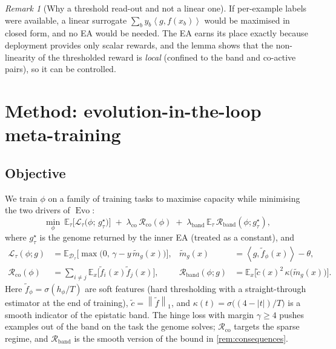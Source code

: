 \documentclass[11pt,a4paper]{article}
\theoremstyle{definition}
\theoremstyle{plain}
\theoremstyle{remark}
\newtheorem{remark}[definition]{Remark}
\newcommand{\E}{\mathbb{E}}
\newcommand{\Dist}{\mathcal{D}}
\newcommand{\norm}[1]{\left\lVert #1 \right\rVert}
\newcommand{\ip}[2]{\left\langle #1, #2 \right\rangle}
\newcommand{\Evo}{\operatorname{Evo}}
\begin{document}
\begin{remark}[Why a threshold read-out and not a linear one]
If per-example labels were available, a linear surrogate $\sum_b y_b\ip{g}{f(x_b)}$ would be maximised in closed form, and no EA would be needed. The EA earns its place exactly because deployment provides only scalar rewards, and the lemma shows that the non-linearity of the thresholded reward is \emph{local} (confined to the band and co-active pairs), so it can be controlled.
\end{remark}

\section{Method: evolution-in-the-loop meta-training}
\label{sec:method}

\subsection{Objective}

We train $\phi$ on a family of training tasks to maximise capacity while minimising the two drivers of $\Evo$:
\begin{equation}
\label{eq:objective}
\min_\phi\ \E_\tau\Big[\mathcal{L}_\tau\big(\phi;\,g^\star_\tau\big)\Big] \;+\; \lambda_{\text{co}}\,\mathcal{R}_{\text{co}}(\phi) \;+\; \lambda_{\text{band}}\,\E_\tau\,\mathcal{R}_{\text{band}}(\phi; g^\star_\tau),
\end{equation}
where $g^\star_\tau$ is the genome returned by the inner EA (treated as a constant), and
\begin{align}
\mathcal{L}_\tau(\phi;g) &= \E_{\Dist_\tau}\big[\max\big(0,\,\gamma - y\,\tilde m_g(x)\big)\big], & \tilde m_g(x) &= \ip{g}{\tilde f_\phi(x)}-\theta,\\
\mathcal{R}_{\text{co}}(\phi) &= \textstyle\sum_{i\neq j}\E_x\big[\tilde f_i(x)\tilde f_j(x)\big], &
\mathcal{R}_{\text{band}}(\phi;g) &= \E_{x}\big[\tilde c(x)^2\, \kappa\big(\tilde m_g(x)\big)\big].
\end{align}
Here $\tilde f_\phi = \sigma(h_\phi/T)$ are soft features (hard thresholding with a straight-through estimator at the end of training), $\tilde c = \norm{\tilde f}_1$, and $\kappa(t) = \sigma\big((4-|t|)/T\big)$ is a smooth indicator of the epistatic band. The hinge loss with margin $\gamma\ge4$ pushes examples out of the band on the task the genome solves; $\mathcal{R}_{\text{co}}$ targets the sparse regime, and $\mathcal{R}_{\text{band}}$ is the smooth version of the bound in \cref{rem:consequences}.
\end{document}
